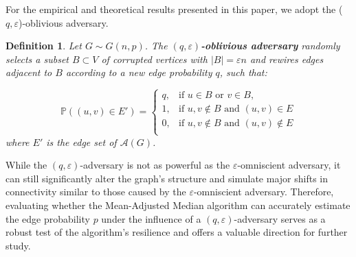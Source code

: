 \documentclass[10pt,onecolumn,letterpaper]{article}
\newtheorem{defin}[thm]{Definition}
\newcommand{\eps}{\varepsilon}
\let\epsilon\varepsilon
\begin{document}
For the empirical and theoretical results presented in this paper, we adopt the (\(q,\epsilon\))-oblivious adversary.

\begin{defin}
    \label{(q, epsilon)-Adversary}
    Let \( G \sim G(n,p)\). The {\bf $(q,\eps)$-oblivious adversary} randomly selects a subset \(B\subset V\) of corrupted vertices with \(|B| = \eps n\) and rewires edges adjacent to \( B \) according to a new edge probability \( q \), such that:
    
    \[
    \mathbb{P}((u, v) \in E') =
    \begin{cases} 
    q, & \text{if } u \in B \text{ or } v \in B, \\
    1, & \text{if }  u,v\notin B \text{ and } (u,v) \in E\\
    0, & \text{if } u,v\notin B \text{ and } (u,v) \notin E\\
    \end{cases}
    \]
    where \(E'\) is the edge set of \(\mathcal{A}(G)\).
\end{defin}

While the \((q, \epsilon)\)-adversary is not as powerful as the \(\epsilon\)-omniscient adversary, it can still significantly alter the graph's structure and simulate major shifts in connectivity similar to those caused by the \(\epsilon\)-omniscient adversary. Therefore, evaluating whether the Mean-Adjusted Median algorithm can accurately estimate the edge probability \(p\) under the influence of a \((q, \epsilon)\)-adversary serves as a robust test of the algorithm's resilience and offers a valuable direction for further study.
\end{document}
